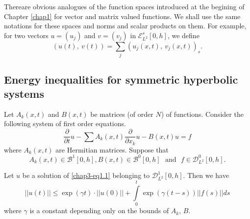  \chapter{}\label{chap3}
 
 There\pageoriginale are obvious analogues of the function spaces
 introduced at the 
 begining of Chapter \ref{chap1} for vector and  matrix valued functions. We
 shall use the same notations for these spaces and norms and scalar
 products on them. For example,  for two vectors $u=(u_j)$ and $v=
 (v_j)$ in $\mathscr{E}^s_{L^2} [0,  h]$,  we define 
 $$
 (u(t), ~ v(t)) = \sum\limits_j (u_j(x, t), ~ v_j(x, t))_s.
 $$
 

 \section{Energy inequalities for symmetric hyperbolic systems}\label{chap3-sec1}%
  
  Let $A_k(x, t)$ and $B(x, t)$ be matrices (of order $N$) of
  functions. Consider the following system of first order equations. 
\begin{equation}
\frac{\partial}{\partial t} u - \sum A_k (x, t) \frac{\partial}{\partial
  x_k} u -B (x, t) u = f \tag{1.1} \label{chap3-eq1.1}
 \end{equation} 
 where $A_k (x,  t)$ are Hermitian matrices. Suppose that 
$$
A_k (x,  t)
 \in \mathscr{B}^1 [0, h], B (x,t) \in \mathscr{B}^0
             [0,h]\text{~ and~ } f \in  \mathscr{D}^0_{L^2} [0,
               h]. 
$$  

\setcounter{proposition}{0}
\begin{proposition}[Friedrichs]\label{chap3-sec1-prop1} %
 Let $u$ be a solution of \eqref{chap3-eq1.1} belonging to
  $\mathscr{D}^1_{L^2} [0,  h]$. Then we have 
\begin{equation}
||u(t)|| \leq \exp (\gamma t)\cdot ||u(0)|| + \int\limits^t_0 \exp
(\gamma (t-s))|| f(s)|| ds \tag{1.2}\label{chap3-eq1.2} 
\end{equation}
where $\gamma$ is a constant depending only on the bounds of $A_k$,
$B$.  
\end{proposition} 

